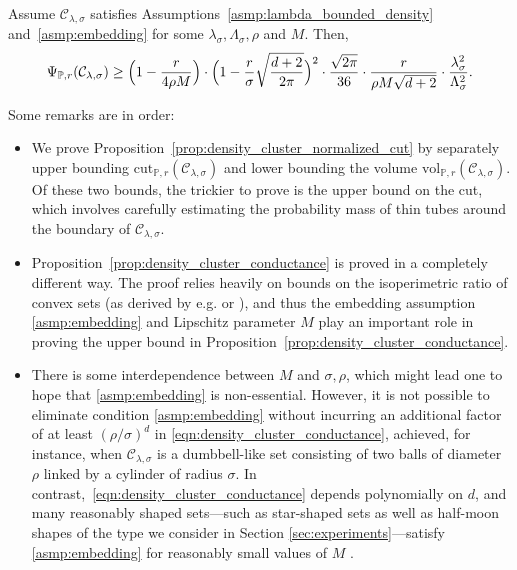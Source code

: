 \documentclass[11pt,twoside]{article}
\newcommand{\1}{\mathbf{1}}
\newcommand{\mc}[1]{\mathcal{#1}}
\newcommand{\Pbb}{\mathbb{P}}
\newcommand{\vol}{\mathrm{vol}}
\newcommand{\cut}{\mathrm{cut}}
\begin{document}
\begin{proposition}
	\label{prop:density_cluster_conductance}
	Assume $\mc{C}_{\lambda,\sigma}$ satisfies Assumptions~\ref{asmp:lambda_bounded_density} and~\ref{asmp:embedding} for some $\lambda_{\sigma}, \Lambda_{\sigma}, \rho$ and $M$. Then,
	\begin{equation}
	\label{eqn:density_cluster_conductance}
	\Psi_{\Pbb,r}(\mc{C}_{\lambda,\sigma}) \geq \Bigl(1 - \frac{r}{4\rho M}\Bigr) \cdot \Bigl(1 - \frac{r}{\sigma}\sqrt{\frac{d + 2}{2\pi}}\Bigr)^2 \cdot \frac{\sqrt{2\pi}}{36} \cdot \frac{r}{\rho M \sqrt{d + 2}} \cdot \frac{\lambda_{\sigma}^2}{\Lambda_{\sigma}^2}.
	\end{equation}
\end{proposition}
Some remarks are in order:
\begin{itemize}
	\item We prove Proposition~\ref{prop:density_cluster_normalized_cut} by separately upper bounding $\cut_{\Pbb,r}(\mc{C}_{\lambda,\sigma})$ and lower bounding the volume $\vol_{\Pbb,r}(\mc{C}_{\lambda,\sigma})$. Of these two bounds, the trickier to prove is the upper bound on the cut, which involves carefully estimating the probability mass of thin tubes around the boundary of $\mc{C}_{\lambda,\sigma}$. 
	\item Proposition~\ref{prop:density_cluster_conductance} is proved in a completely different way. The proof relies heavily on bounds on the isoperimetric ratio of convex sets (as derived by e.g. \cite{lovasz1990} or \cite{dyer1991b}), and thus the embedding assumption \ref{asmp:embedding} and Lipschitz parameter $M$
	play an important role in proving the upper bound in Proposition~\ref{prop:density_cluster_conductance}. 
	\item There is some interdependence between $M$ and $\sigma,\rho$, which might lead one to hope that \ref{asmp:embedding} is
	non-essential. However, it is not possible to eliminate condition \ref{asmp:embedding} without incurring an additional factor of at least
	$(\rho/\sigma)^d$ in \eqref{eqn:density_cluster_conductance}, achieved, for
	instance, when $\mc{C}_{\lambda,\sigma}$ is a dumbbell-like set consisting of two balls of diameter $\rho$ linked by a cylinder of radius $\sigma$. In contrast,~\eqref{eqn:density_cluster_conductance} depends polynomially on $d$, and many reasonably shaped sets---such as star-shaped sets as well as half-moon shapes of the type we consider in Section \ref{sec:experiments}---satisfy \ref{asmp:embedding} for reasonably small values of $M$ \citep{abbasi-yadkori2016a, abbasi-yadkori2016}.
\end{itemize}
\end{document}
